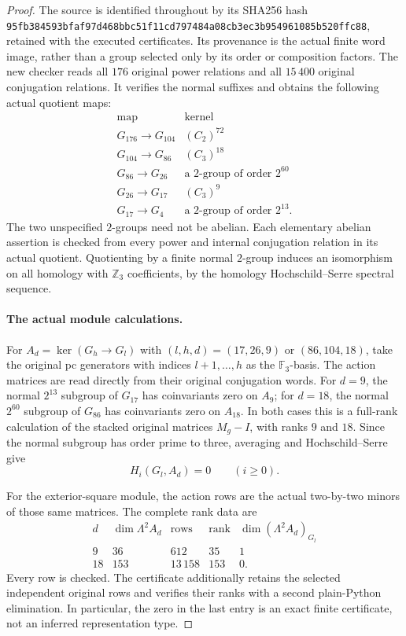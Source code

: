\begin{proof}
The source is identified throughout by its SHA256 hash
\texttt{95fb3845\allowbreak{}93bfaf97\allowbreak{}d468bbc5\allowbreak{}1f11cd79\allowbreak{}7484a08c\allowbreak{}b3ec3b95\allowbreak{}4961085b\allowbreak{}520ffc88},
retained with the executed certificates.  Its provenance is the actual
finite word image, rather than a group selected only by its order or
composition factors.  The new checker reads all $176$ original power
relations and all $15\,400$ original conjugation relations.  It verifies
the normal suffixes and obtains the following actual quotient maps:
\[
\begin{array}{c|c}
 \text{map}&\text{kernel}\\\hline
 G_{176}\to G_{104}&(C_2)^{72}\\
 G_{104}\to G_{86}&(C_3)^{18}\\
 G_{86}\to G_{26}&\text{a }2\text{-group of order }2^{60}\\
 G_{26}\to G_{17}&(C_3)^9\\
 G_{17}\to G_4&\text{a }2\text{-group of order }2^{13}.
\end{array}
 \tag{C.42.5}
\]
The two unspecified $2$-groups need not be abelian.  Each elementary
abelian assertion is checked from every power and internal conjugation
relation in its actual quotient.  Quotienting by a finite normal
$2$-group induces an isomorphism on all homology with $\mathbb Z_3$
coefficients, by the homology Hochschild--Serre spectral sequence.

\paragraph{The actual module calculations.}
For $A_d=\ker(G_h\to G_l)$ with $(l,h,d)=(17,26,9)$ or
$(86,104,18)$, take the original pc generators with indices
$l+1,\ldots,h$ as the $\mathbb F_3$-basis.  The action matrices are
read directly from their original conjugation words.  For $d=9$, the
normal $2^{13}$ subgroup of $G_{17}$ has coinvariants zero on $A_9$;
for $d=18$, the normal $2^{60}$ subgroup of $G_{86}$ has coinvariants
zero on $A_{18}$.  In both cases this is a full-rank calculation of
the stacked original matrices $M_g-I$, with ranks $9$ and $18$.
Since the normal subgroup has order prime to three, averaging and
Hochschild--Serre give
\[
                   H_i(G_l,A_d)=0\qquad(i\ge0).
 \tag{C.42.6}
\]

For the exterior-square module, the action rows are the actual
two-by-two minors of those same matrices.  The complete rank data are
\[
\begin{array}{c|r|r|r|r}
 d&\dim\Lambda^2A_d&\text{rows}&\text{rank}
                   &\dim(\Lambda^2A_d)_{G_l}\\\hline
 9&36&612&35&1\\
 18&153&13\,158&153&0.
\end{array}
 \tag{C.42.7}
\]
Every row is checked.  The certificate additionally retains the selected
independent original rows and verifies their ranks with a second
plain-Python elimination.  In particular, the zero in the last entry
is an exact finite certificate, not an inferred representation type.


\end{proof}
